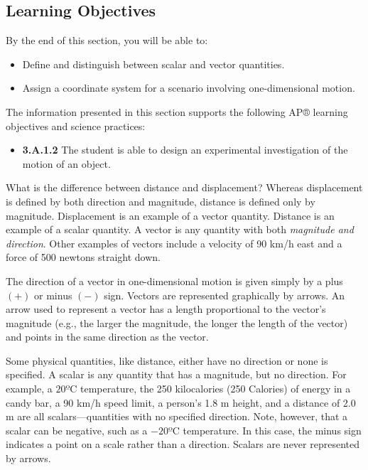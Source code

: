 \documentclass[
]{book}
\providecommand{\tightlist}{%
  \setlength{\itemsep}{0pt}\setlength{\parskip}{0pt}}
\newenvironment{learning-objectives}{}{}
\begin{document}
\hypertarget{fs-id1545372}{}
\begin{learning-objectives}

\hypertarget{learning-objectives}{%
\subsection{Learning Objectives}\label{learning-objectives}}

By the end of this section, you will be able to:

\begin{itemize}
\tightlist
\item
  Define and distinguish between scalar and vector quantities.
\item
  Assign a coordinate system for a scenario involving one-dimensional
  motion.
\end{itemize}

The information presented in this section supports the following AP®
learning objectives and science practices:

\begin{itemize}
\tightlist
\item
  \textbf{3.A.1.2} The student is able to design an experimental
  investigation of the motion of an object.
\end{itemize}

\end{learning-objectives}

What is the difference between distance and displacement? Whereas
displacement is defined by both direction and magnitude, distance is
defined only by magnitude. Displacement is an example of a vector
quantity. Distance is an example of a scalar quantity. A
\protect\hypertarget{import-auto-id1738434}{}{vector} is any quantity with
both \emph{magnitude and direction}. Other examples of vectors include a
velocity of 90 km/h east and a force of 500 newtons straight down.

The direction of a vector in one-dimensional motion is given simply by a
plus \({( + )}{}\) or minus \({( - )}{}\) sign. Vectors are represented
graphically by arrows. An arrow used to represent a vector has a length
proportional to the vector's magnitude (e.g., the larger the magnitude,
the longer the length of the vector) and points in the same direction as
the vector.

Some physical quantities, like distance, either have no direction or
none is specified. A \protect\hypertarget{import-auto-id1759638}{}{scalar}
is any quantity that has a magnitude, but no direction. For example, a
\(\text{20ºC}\) temperature, the 250 kilocalories (250 Calories) of energy
in a candy bar, a 90 km/h speed limit, a person's 1.8 m height, and a
distance of 2.0 m are all scalars---quantities with no specified
direction. Note, however, that a scalar can be negative, such as a
\(- \text{20ºC}\) temperature. In this case, the minus sign indicates a
point on a scale rather than a direction. Scalars are never represented
by arrows.
\end{document}
